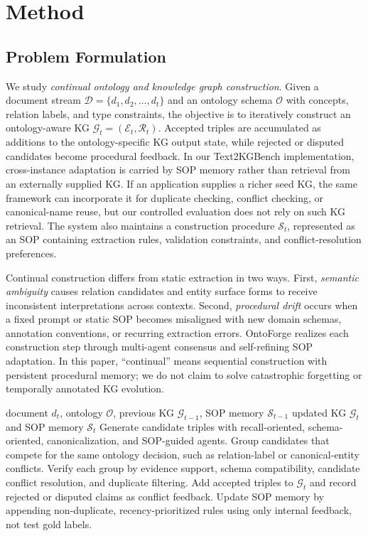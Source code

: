 \documentclass[sigconf]{acmart}
\begin{document}
\section{Method}
\label{sec:method}

\subsection{Problem Formulation}

We study \textit{continual ontology and knowledge graph construction}. Given a document stream $\mathcal{D}=\{d_1,d_2,\ldots,d_t\}$ and an ontology schema $\mathcal{O}$ with concepts, relation labels, and type constraints, the objective is to iteratively construct an ontology-aware KG $\mathcal{G}_t=(\mathcal{E}_t,\mathcal{R}_t)$. Accepted triples are accumulated as additions to the ontology-specific KG output state, while rejected or disputed candidates become procedural feedback. In our Text2KGBench implementation, cross-instance adaptation is carried by SOP memory rather than retrieval from an externally supplied KG. If an application supplies a richer seed KG, the same framework can incorporate it for duplicate checking, conflict checking, or canonical-name reuse, but our controlled evaluation does not rely on such KG retrieval. The system also maintains a construction procedure $\mathcal{S}_t$, represented as an SOP containing extraction rules, validation constraints, and conflict-resolution preferences.

Continual construction differs from static extraction in two ways. First, \textit{semantic ambiguity} causes relation candidates and entity surface forms to receive inconsistent interpretations across contexts. Second, \textit{procedural drift} occurs when a fixed prompt or static SOP becomes misaligned with new domain schemas, annotation conventions, or recurring extraction errors. OntoForge realizes each construction step through multi-agent consensus and self-refining SOP adaptation. In this paper, ``continual'' means sequential construction with persistent procedural memory; we do not claim to solve catastrophic forgetting or temporally annotated KG evolution.

\begin{algorithm}[t]
\caption{One OntoForge construction step}
\label{alg:ontoforge}
\small
\begin{algorithmic}[1]
\Require document $d_t$, ontology $\mathcal{O}$, previous KG $\mathcal{G}_{t-1}$, SOP memory $\mathcal{S}_{t-1}$
\Ensure updated KG $\mathcal{G}_t$ and SOP memory $\mathcal{S}_t$
\State Generate candidate triples with recall-oriented, schema-oriented, canonicalization, and SOP-guided agents.
\State Group candidates that compete for the same ontology decision, such as relation-label or canonical-entity conflicts.
\State Verify each group by evidence support, schema compatibility, candidate conflict resolution, and duplicate filtering.
\State Add accepted triples to $\mathcal{G}_t$ and record rejected or disputed claims as conflict feedback.
\State Update SOP memory by appending non-duplicate, recency-prioritized rules using only internal feedback, not test gold labels.
\end{algorithmic}
\end{algorithm}
\end{document}
